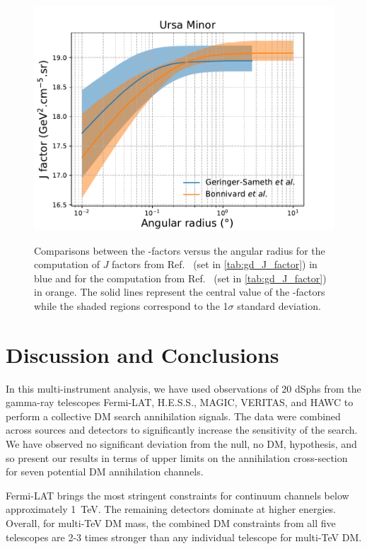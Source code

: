 \begin{figure}[ht]
{    \includegraphics[scale=0.32]{figures/glory_duck/appendix/UrsaMinor.pdf}
}
    \caption{Comparisons between the \J-factors versus the angular radius for the computation of $J$ factors from Ref.~\cite{Geringer-Sameth:2014yza} (\GS set in \cref{tab:gd_J_factor}) in blue and for the computation from Ref.~\cite{Bonnivard:2014kza, Bonnivard:2015xpq} (\B set in \cref{tab:gd_J_factor}) in orange. The solid lines represent the central value of the \J-factors while the shaded regions correspond to the 1$\sigma$ standard deviation.}
\label{fig:comparison_J_2}
\end{figure}

\section{Discussion and Conclusions\label{sec:gd_conclusions}}

In this multi-instrument analysis, we have used observations of 20 dSphs from the gamma-ray telescopes Fermi-LAT, H.E.S.S., MAGIC, VERITAS, and HAWC to perform a collective DM search annihilation signals.
The data were combined across sources and detectors to significantly increase the sensitivity of the search.
We have observed no significant deviation from the null, no DM, hypothesis, and so present our results in terms of upper limits on the annihilation cross-section for seven potential DM annihilation channels.

Fermi-LAT brings the most stringent constraints for continuum channels below approximately 1~TeV.
The remaining detectors dominate at higher energies.
Overall, for multi-TeV DM mass, the combined DM constraints from all five telescopes are 2-3 times stronger than any individual telescope for multi-TeV DM.

